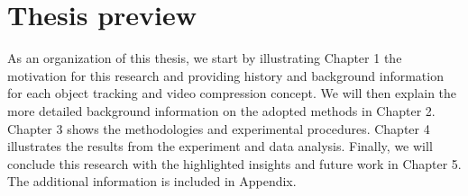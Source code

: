 \section{Thesis preview}
\label{sec:introduction/thesis_preview}

As an organization of this thesis, we start by illustrating Chapter 1 the motivation for this research and providing history and background information for each object tracking and video compression concept. We will then explain the more detailed background information on the adopted methods in Chapter 2. Chapter 3 shows the methodologies and experimental procedures. Chapter 4 illustrates the results from the experiment and data analysis. Finally, we will conclude this research with the highlighted insights and future work in Chapter 5. The additional information is included in Appendix.